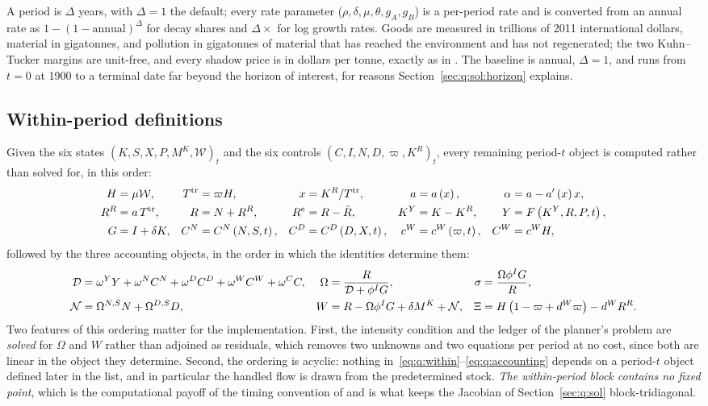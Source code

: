  A period is $\Delta$ years, with $\Delta=1$ the default; every rate parameter ($\rho,\delta,\mu,\theta,g_A,g_B$) is a per-period rate and is converted from an annual rate as $1-\left(1-\text{annual}\right)^{\Delta}$ for decay shares and $\Delta\times$ for log growth rates. Goods are measured in trillions of 2011 international dollars, material in gigatonnes, and pollution in gigatonnes of material that has reached the environment and has not regenerated; the two Kuhn--Tucker margins are unit-free, and every shadow price is in dollars per tonne, exactly as in . The baseline is annual, $\Delta=1$, and runs from $t=0$ at 1900 to a terminal date far beyond the horizon of interest, for reasons Section~\ref{sec:q:sol:horizon} explains.

\subsection{Within-period definitions}\label{sec:q:model:within}

Given the six states $\left(K,S,X,P,M^K,\mathcal W\right)_t$ and the six controls $\left(C,I,N,D,\varpi,K^R\right)_t$, every remaining period-$t$ object is computed rather than solved for, in this order:
\begin{align}
H &= \mu\mathcal W, &
T^{\mathrm{tr}} &= \varpi H, &
x &= K^R/T^{\mathrm{tr}}, &
a &= a\left(x\right), &
\alpha &= a-a'\left(x\right)x,
\notag\\
R^R &= a\,T^{\mathrm{tr}}, &
R &= N+R^R, &
R^{e} &= R-\bar R, &
K^Y &= K-K^R, &
Y &= F\left(K^Y,R,P,t\right),
\notag\\
G &= I+\delta K, &
C^N &= C^N\left(N,S,t\right), &
C^D &= C^D\left(D,X,t\right), &
c^W &= c^W\left(\varpi,t\right), &
C^W &= c^WH,
\label{eq:q:within}
\end{align}
followed by the three accounting objects, in the order in which the identities determine them:
\begin{align}
\mathcal D &= \omega^YY+\omega^NC^N+\omega^DC^D+\omega^WC^W+\omega^CC,
&
\Omega &= \frac{R}{\mathcal D+\phi^IG},
&
\sigma &= \frac{\Omega\phi^IG}{R},
\notag\\
\mathcal N &= \Omega^{N,S}N+\Omega^{D,S}D,
&
W &= R-\Omega\phi^IG+\delta M^K+\mathcal N,
&
\Xi &= H\left(1-\varpi+d^W\varpi\right)-d^WR^R .
\label{eq:q:accounting}
\end{align}
Two features of this ordering matter for the implementation. First, the intensity condition and the ledger of the planner's problem are \emph{solved} for $\Omega$ and $W$ rather than adjoined as residuals, which removes two unknowns and two equations per period at no cost, since both are linear in the object they determine. Second, the ordering is acyclic: nothing in~\eqref{eq:q:within}--\eqref{eq:q:accounting} depends on a period-$t$ object defined later in the list, and in particular the handled flow is drawn from the predetermined stock. \emph{The within-period block contains no fixed point}, which is the computational payoff of the timing convention of  and is what keeps the Jacobian of Section~\ref{sec:q:sol} block-tridiagonal.

